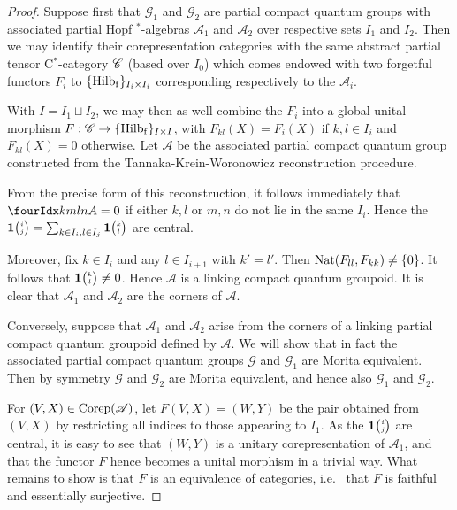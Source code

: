 \begin{proof} Suppose first that $\mathscr{G}_1$ and $\mathscr{G}_2$ are partial compact quantum groups with associated partial Hopf $^*$-algebras $\mathscr{A}_1$ and $\mathscr{A}_2$ over respective sets $I_1$ and $I_2$. Then we may identify their corepresentation categories with the same abstract partial tensor C$^*$-category $\mathscr{C}$ (based over $I_0$) which comes endowed with two forgetful functors $F_i$ to $\{\mathrm{Hilb}_{\operatorname{\mathrm{f}}}\}_{I_i\times I_i}$ corresponding respectively to the $\mathscr{A}_i$.

With $I = I_1\sqcup I_2$, we may then as well combine the $F_i$ into a global unital morphism $F:\mathscr{C} \rightarrow \{\mathrm{Hilb}_{\operatorname{\mathrm{f}}}\}_{I\times I}$, with $F_{kl}(X)=F_i(X)$ if $k,l\in I_i$ and $F_{kl}(X)=0$ otherwise. Let $\mathscr{A}$ be the associated partial compact quantum group constructed from the Tannaka-Krein-Woronowicz reconstruction procedure. 

From the precise form of this reconstruction, it follows immediately that $\Gr{A}{k}{l}{m}{n} =0$ if either $k,l$ or $m,n$ do not lie in the same $I_i$. Hence the $\mathbf{1}{\tiny {\begin{pmatrix} i\\j\end{pmatrix}}} = \sum_{k\in I_i,l\in I_j} \mathbf{1}{\tiny {\begin{pmatrix} k\\l\end{pmatrix}}}$ are central. 

Moreover, fix $k\in I_i$ and any $l\in I_{i+1}$ with $k'=l'$. Then $\operatorname{\mathrm{Nat}}(F_{ll},F_{kk})\neq \{0\}$. It follows that $\mathbf{1}{\tiny {\begin{pmatrix} k\\l\end{pmatrix}}}\neq 0$. Hence $\mathscr{A}$ is a linking compact quantum groupoid. It is clear that $\mathscr{A}_1$ and $\mathscr{A}_2$ are the corners of $\mathscr{A}$. 

Conversely, suppose that $\mathscr{A}_1$ and $\mathscr{A}_2$ arise from the corners of a linking partial compact quantum groupoid defined by $\mathscr{A}$. We will show that in fact the associated partial compact quantum groups $\mathscr{G}$ and $\mathscr{G}_1$ are Morita equivalent. Then by symmetry $\mathscr{G}$ and $\mathscr{G}_2$ are Morita equivalent, and hence also $\mathscr{G}_1$ and $\mathscr{G}_2$.

For $(V,X) \in \mathrm{Corep}(\mathscr{A})$, let $F(V,X) = (W,Y)$ be the pair obtained from $(V,X)$ by restricting all indices to those appearing to $I_1$. As the $\mathbf{1}{\tiny {\begin{pmatrix} i\\j\end{pmatrix}}}$ are central, it is easy to see that $(W,Y)$ is a unitary corepresentation of $\mathscr{A}_1$, and that the functor $F$ hence becomes a unital morphism in a trivial way. What remains to show is that $F$ is an equivalence of categories, i.e.~ that $F$ is faithful and essentially surjective. 


\end{proof}
